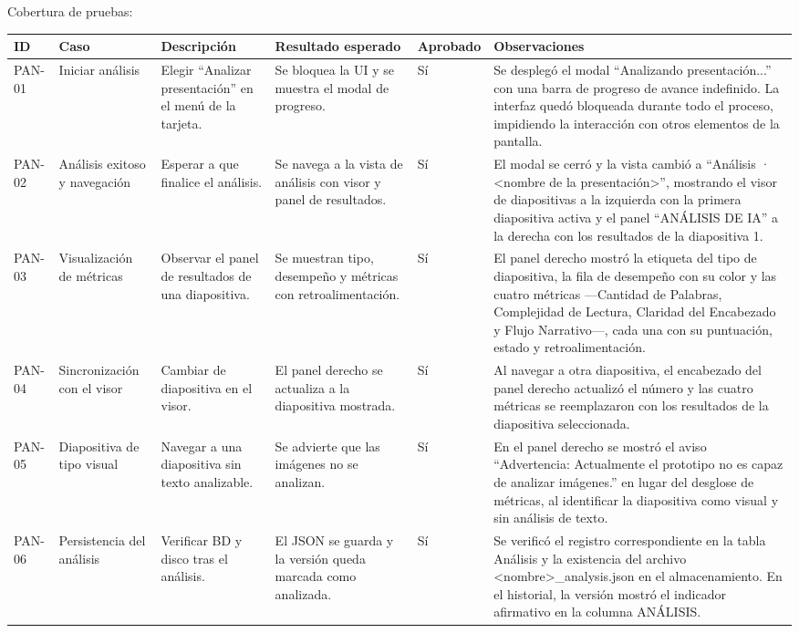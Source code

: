 \documentclass[11pt]{article}
\begin{document}
\newpage
Cobertura de pruebas:

{\tiny
\renewcommand{\arraystretch}{1.15}
\begin{longtable}{@{}|L{1.2cm}|L{2.5cm}|L{3.4cm}|L{3.8cm}|L{1.5cm}|L{2.3cm}|@{}}
\hline
\textbf{ID} & \textbf{Caso} & \textbf{Descripción} & \textbf{Resultado esperado} & \textbf{Aprobado} & \textbf{Observaciones} \\ \hline
\endhead
PAN-01 & Iniciar análisis & Elegir ``Analizar presentación'' en el menú de la tarjeta. & Se bloquea la UI y se muestra el modal de progreso. & Sí & Se desplegó el modal “Analizando presentación...” con una barra de progreso de avance indefinido. La interfaz quedó bloqueada durante todo el proceso, impidiendo la interacción con otros elementos de la pantalla. \\ \hline
PAN-02 & Análisis exitoso y navegación & Esperar a que finalice el análisis. & Se navega a la vista de análisis con visor y panel de resultados. & Sí & El modal se cerró y la vista cambió a “Análisis · <nombre de la presentación>”, mostrando el visor de diapositivas a la izquierda con la primera diapositiva activa y el panel “ANÁLISIS DE IA” a la derecha con los resultados de la diapositiva 1. \\ \hline
PAN-03 & Visualización de métricas & Observar el panel de resultados de una diapositiva. & Se muestran tipo, desempeño y métricas con retroalimentación. & Sí & El panel derecho mostró la etiqueta del tipo de diapositiva, la fila de desempeño con su color y las cuatro métricas —Cantidad de Palabras, Complejidad de Lectura, Claridad del Encabezado y Flujo Narrativo—, cada una con su puntuación, estado y retroalimentación. \\ \hline
PAN-04 & Sincronización con el visor & Cambiar de diapositiva en el visor. & El panel derecho se actualiza a la diapositiva mostrada. & Sí & Al navegar a otra diapositiva, el encabezado del panel derecho actualizó el número y las cuatro métricas se reemplazaron con los resultados de la diapositiva seleccionada. \\ \hline
PAN-05 & Diapositiva de tipo visual & Navegar a una diapositiva sin texto analizable. & Se advierte que las imágenes no se analizan. & Sí & En el panel derecho se mostró el aviso “Advertencia: Actualmente el prototipo no es capaz de analizar imágenes.” en lugar del desglose de métricas, al identificar la diapositiva como visual y sin análisis de texto. \\ \hline
PAN-06 & Persistencia del análisis & Verificar BD y disco tras el análisis. & El JSON se guarda y la versión queda marcada como analizada. & Sí & Se verificó el registro correspondiente en la tabla Análisis y la existencia del archivo <nombre>\_analysis.json en el almacenamiento. En el historial, la versión mostró el indicador afirmativo en la columna ANÁLISIS. \\ \hline

\end{longtable}}
\end{document}
